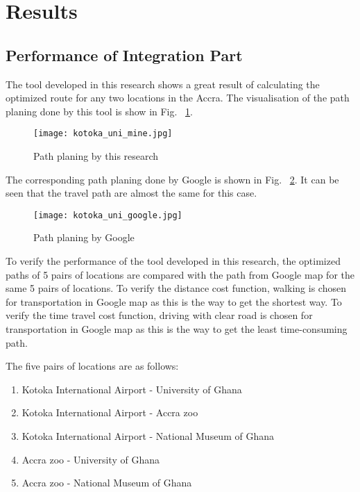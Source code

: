 \documentclass[final-report]{report-template}
\begin{document}
\section {Results}
\subsection{Performance of Integration Part}
The tool developed in this research shows a great result of calculating the optimized route for any two locations in the Accra.
The visualisation of the path planing done by this tool is show in Fig. ~\ref{fig:mine}.

\begin{figure}[H]
    \centering
    \texttt{[image: kotoka\_uni\_mine.jpg]}
    \caption{\label{fig:mine} Path planing by this research}
\end{figure}
The corresponding path planing done by Google is shown in Fig. ~\ref{fig:google}. 
It can be seen that the travel path are almost the same for this case.
\begin{figure}[H]
    \centering
    \texttt{[image: kotoka\_uni\_google.jpg]}
    \caption{\label{fig:google} Path planing by Google}
\end{figure}

To verify the performance of the tool developed in this research, 
the optimized paths of 5 pairs of locations are compared with the path from Google map for the same 5 pairs of locations.
To verify the distance cost function, walking is chosen for transportation in Google map as this is the way to get the shortest way.
To verify the time travel cost function, driving with clear road is chosen for transportation in Google map as this is the way to get the least time-consuming path.

The five pairs of locations are as follows:
\begin{enumerate}
    \item Kotoka International Airport - University of Ghana
    \item Kotoka International Airport - Accra zoo
    \item Kotoka International Airport - National Museum of Ghana
    \item Accra zoo - University of Ghana
    \item Accra zoo - National Museum of Ghana
\end{enumerate}
\end{document}
